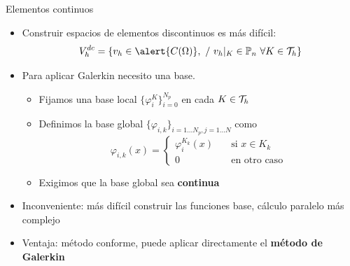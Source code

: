 \documentclass[10pt,leqno]{beamer}
\newcommand{\Nt}{N}
\newcommand{\Np}{{N_p}}
\begin{document}
\begin{frame}{Elementos continuos}
  \begin{itemize}
  \item Construir espacios de elementos discontinuos es más difícil:
  $$
  V_h^{dc} = \{ \vh\in \alert{C(\Omega)},\ /\ \vh|_K \in
  \mathbb{P}_n\ \forall K\in\Th\}
  $$
\item
  Para aplicar Galerkin necesito una base.
  \begin{itemize}
  \item Fijamos una base local $\{\varphi_i^K\}_{i=0}^{\Np}$ en cada
    $K\in {\cal T}_h$
  \item Definimos la base global
    $\{\varphi_{i,k}\}_{i=1...\Np, j=1...\Nt}$ como
    \begin{equation*}
      \varphi_{i,k}(x) = \left\{
        \begin{aligned}
          \varphi_i^{K_k} (x) &\quad \text{si } x\in K_k \\
          0 &\quad \text{en otro caso}
        \end{aligned}
      \right.
    \end{equation*}
  \item \alert{Exigimos que la base global sea \textbf{continua}}
  \end{itemize}
\item Inconveniente:  más difícil construir las funciones base, cálculo paralelo más complejo
\item Ventaja: método conforme, puede aplicar directamente el
  \textbf{método de Galerkin}
\end{itemize}
\end{frame}

{}
\end{document}
